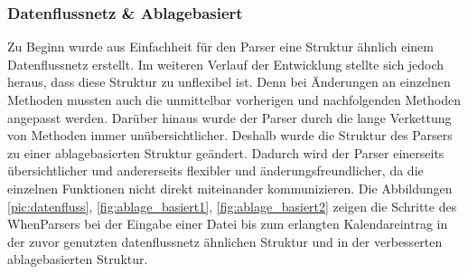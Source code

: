 \subsubsection{Datenflussnetz \& Ablagebasiert}
Zu Beginn wurde aus Einfachheit für den Parser eine Struktur ähnlich einem Datenflussnetz erstellt. %
	Im weiteren Verlauf der Entwicklung stellte sich jedoch heraus, dass diese Struktur zu unflexibel ist. %
		Denn bei Änderungen an einzelnen Methoden mussten auch die unmittelbar vorherigen und nachfolgenden Methoden angepasst werden. %
	Darüber hinaus wurde der Parser durch die lange Verkettung von Methoden immer unübersichtlicher.
Deshalb wurde die Struktur des Parsers zu einer ablagebasierten Struktur geändert. %
	Dadurch wird der Parser einerseits übersichtlicher und andererseits flexibler und änderungsfreundlicher, da die einzelnen Funktionen nicht direkt miteinander kommunizieren. %
Die Abbildungen \ref{pic:datenfluss}, \ref{fig:ablage_basiert1}, \ref{fig:ablage_basiert2} zeigen die Schritte des WhenParsers bei der Eingabe einer Datei bis zum erlangten Kalendareintrag in der zuvor genutzten datenflussnetz ähnlichen Struktur und in der verbesserten ablagebasierten Struktur.
%
%
%
%